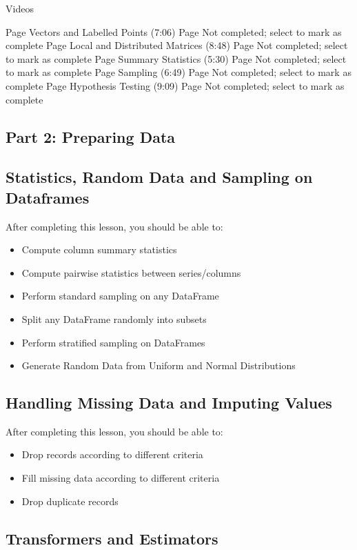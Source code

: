Videos

Page Vectors and Labelled Points (7:06) Page Not completed; select to mark as complete
Page Local and Distributed Matrices (8:48) Page Not completed; select to mark as complete
Page Summary Statistics (5:30) Page Not completed; select to mark as complete
Page Sampling (6:49) Page Not completed; select to mark as complete
Page Hypothesis Testing (9:09) Page Not completed; select to mark as complete


\newpage
\subsection{Part 2: Preparing Data}
 
\subsection{Statistics, Random Data and Sampling on Dataframes}

After completing this lesson, you should be able to:
\begin{itemize}
\item Compute column summary statistics
\item Compute pairwise statistics between series/columns
\item Perform standard sampling on any DataFrame
\item Split any DataFrame randomly into subsets
\item Perform stratified sampling on DataFrames
\item Generate Random Data from Uniform and Normal Distributions
\end{itemize}

\subsection{Handling Missing Data and Imputing Values}

After completing this lesson, you should be able to:
\begin{itemize}
\item Drop records according to different criteria
\item Fill missing data according to different criteria
\item Drop duplicate records
\end{itemize}

\subsection{Transformers and Estimators}

